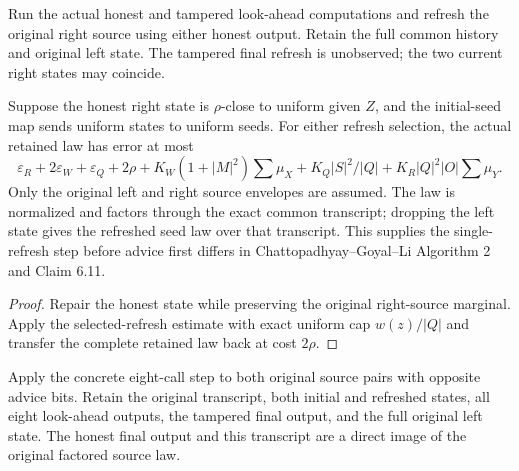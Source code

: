\begin{definition}
  \label{def:lowerbounds-algebraic-uniform-refresh}
  \leanok
  Run the actual honest and tampered look-ahead computations and refresh
  the original right source using either honest output. Retain the full
  common history and original left state. The tampered final refresh is
  unobserved; the two current right states may coincide.
\end{definition}

\begin{theorem}
  \label{thm:lowerbounds-algebraic-uniform-refresh}
  \leanok
  Suppose the honest right state is $\rho$-close to uniform given $Z$,
  and the initial-seed map sends uniform states to uniform seeds. For
  either refresh selection, the actual retained law has error at most
  \[
    \varepsilon_R+2\varepsilon_W+\varepsilon_Q+2\rho+
      K_W(1+|M|^2)\sum\mu_X+
      K_Q|S|^2/|Q|+K_R|Q|^2|O|\sum\mu_Y.
  \]
  Only the original left and right source envelopes are assumed. The
  law is normalized and factors through the exact common transcript;
  dropping the left state gives the refreshed seed law over that transcript.
  This supplies the single-refresh step before advice first differs in
  Chattopadhyay--Goyal--Li Algorithm 2 and Claim 6.11.
\end{theorem}
\begin{proof}
  \leanok
  Repair the honest state while preserving the original right-source
  marginal. Apply the selected-refresh estimate with exact uniform cap
  $w(z)/|Q|$ and transfer the complete retained law back at cost $2\rho$.
\end{proof}

\begin{definition}
  \label{def:lowerbounds-algebraic-opposite-flipflop}
  \leanok
  Apply the concrete eight-call step to both original source pairs with
  opposite advice bits. Retain the original transcript, both initial and
  refreshed states, all eight look-ahead outputs, the tampered final output,
  and the full original left state. The honest final output and this
  transcript are a direct image of the original factored source law.
\end{definition}

